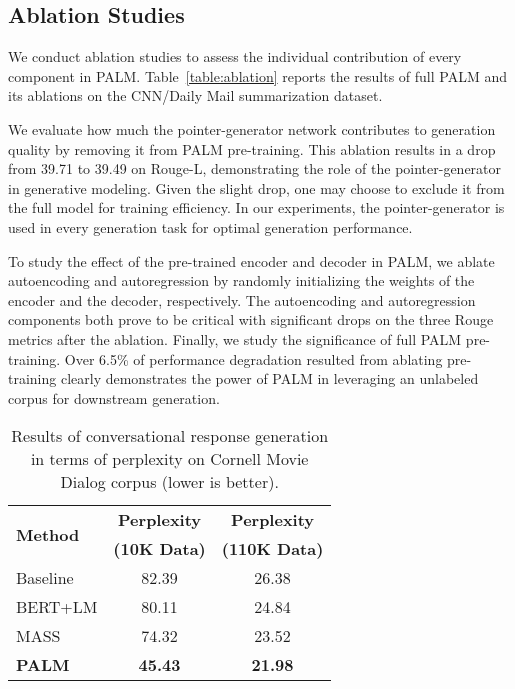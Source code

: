 \documentclass[11pt,a4paper]{article}
\newcommand{\method}{PALM\xspace}
\begin{document}
\vspace{-5pt}
\subsection{Ablation Studies}
\vspace{-5pt}
We conduct ablation studies to assess the individual contribution of every component in \method. Table~\ref{table:ablation} reports the results of full \method and its ablations on the CNN/Daily Mail summarization dataset.

We evaluate how much the pointer-generator network contributes to generation quality by removing it from \method pre-training. This ablation results in a drop from 39.71 to 39.49 on Rouge-L, demonstrating the role of the pointer-generator in generative modeling. Given the slight drop, one may choose to exclude it from the full model for training efficiency. In our experiments, the pointer-generator is used in every generation task for optimal generation performance.

To study the effect of the pre-trained encoder and decoder in \method, we ablate autoencoding and autoregression by randomly initializing the weights of the encoder and the decoder, respectively. The autoencoding and autoregression components both prove to be critical with significant drops on the three Rouge metrics after the ablation. Finally, we study the significance of full \method pre-training. Over 6.5\% of performance degradation resulted from ablating pre-training clearly demonstrates the power of \method in leveraging an unlabeled corpus for downstream generation.

\begin{table}[t]
\center
\begin{tabular}{ l | c | c }
\hline\hline
\multirow{2}{*}{\textbf{Method}} & \textbf{Perplexity} & \textbf{Perplexity}\\
& \textbf{(10K Data)} & \textbf{(110K Data)}\\
\hline\hline
Baseline & 82.39 & 26.38\\
\hline
BERT+LM & 80.11 & 24.84\\
\hline
MASS & 74.32 & 23.52\\
\hline
\textbf{\method} & \textbf{45.43} & \textbf{21.98}\\
\hline\hline
\end{tabular}
\caption{Results of conversational response generation in terms of perplexity on Cornell Movie Dialog corpus (lower is better).}
\label{table:response}
\vspace{-10pt}
\end{table}
\end{document}
